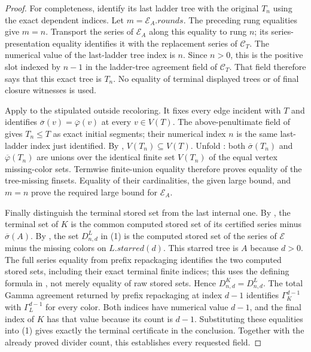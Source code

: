 \begin{proof}
For completeness, identify its last ladder tree with the original $T_n$
using the exact dependent indices. Let $m=\mathcal E_A.\mathit{rounds}$.
The preceding rung equalities give $m=n$. Transport the series of
$\mathcal E_A$ along this equality to rung $n$; its series-presentation
equality identifies it with the replacement series of $\mathcal C_T$.
The numerical value of the last-ladder tree index is $n$. Since $n>0$,
this is the positive slot indexed by $n-1$ in the ladder-tree agreement
field of $\mathcal C_T$. That field therefore says that this exact tree
is $T_n$. No equality of terminal displayed trees or of final closure
witnesses is used.

Apply  to the stipulated outside
recoloring. It fixes every edge incident with $T$ and identifies
$\overline\sigma(v)=\overline\varphi(v)$ at every $v\in V(T)$.
The above-penultimate field of  gives
$T_n\leq T$ as exact initial segments; their numerical index $n$ is
the same last-ladder index just identified. By
,
$V(T_n)\subseteq V(T)$. Unfold : both
$\overline\sigma(T_n)$ and $\overline\varphi(T_n)$ are unions over the
identical finite set $V(T_n)$ of the equal vertex missing-color sets.
Termwise finite-union equality therefore proves equality of the
tree-missing finsets. Equality of their cardinalities, the given large
bound, and $m=n$ prove the required large bound for $\mathcal E_A$.

Finally distinguish the terminal stored set from the last internal one.
By , the terminal set of $K$ is
the common computed stored set of its certified series minus
$\overline\sigma(A)$. By , the set
$D^L_{n,d}$ in (1) is the computed stored set of the series of
$\mathcal E$ minus the missing colors on
$L.\mathit{starred}(d)$. This starred tree is $A$ because $d>0$.
The full series equality from prefix repackaging identifies the two
computed stored sets, including their exact terminal finite indices;
this uses the defining formula in , not
merely equality of raw stored sets. Hence
$D^K_{n,d}=D^L_{n,d}$. The total Gamma agreement returned by
prefix repackaging at index $d-1$ identifies
$\Gamma_K^{d-1}$ with $\Gamma_L^{d-1}$ for every color. Both indices
have numerical value $d-1$, and the final index of $K$ has that value
because its count is $d-1$. Substituting these equalities into (1) gives
exactly the terminal  certificate in
the conclusion. Together with the already proved divider count, this
establishes every requested field.
\end{proof}
